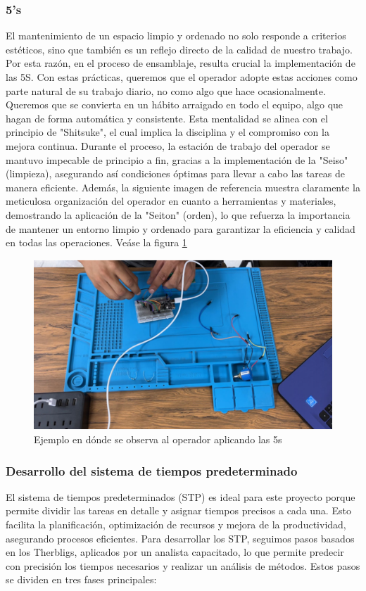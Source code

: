     \subsubsection{5's}
    El mantenimiento de un espacio limpio y ordenado no solo responde a criterios estéticos, sino que también es un reflejo directo de la calidad de nuestro trabajo. Por esta razón, en el proceso de ensamblaje, resulta crucial la implementación de las 5S. \cite{PgSantos}
    Con estas prácticas, queremos que el operador adopte estas acciones como parte natural de su trabajo diario, no como algo que hace ocasionalmente. Queremos que se convierta en un hábito arraigado en todo el equipo, algo que hagan de forma automática y consistente. Esta mentalidad se alinea con el principio de "Shitsuke", el cual implica la disciplina y el compromiso con la mejora continua. Durante el proceso, la estación de trabajo del operador se mantuvo impecable de principio a fin, gracias a la implementación de la "Seiso" (limpieza), asegurando así condiciones óptimas para llevar a cabo las tareas de manera eficiente. Además, la siguiente imagen de referencia    muestra claramente la meticulosa organización del operador en cuanto a herramientas y materiales,  demostrando la aplicación de la "Seiton" (orden), lo que refuerza la importancia de mantener un entorno limpio y ordenado para garantizar la eficiencia y calidad en todas las operaciones. \cite{manzano2016lean}Veáse la figura \ref{fig:5s}
    \begin{figure}[H]
         \centering
         \includegraphics[scale=0.4]{34/img/aplicandoLas5S.png}
         \caption{Ejemplo en dónde se observa al operador aplicando las 5s}
         \label{fig:5s}
     \end{figure}
    \subsubsection{Desarrollo del sistema de tiempos predeterminado}
    El sistema de tiempos predeterminados (STP) es ideal para este proyecto porque permite dividir las tareas en detalle y asignar tiempos precisos a cada una. Esto facilita la planificación, optimización de recursos y mejora de la productividad, asegurando procesos eficientes. Para desarrollar los STP, seguimos pasos basados en los Therbligs, aplicados por un analista capacitado, lo que permite predecir con precisión los tiempos necesarios y realizar un análisis de métodos. Estos pasos se dividen en tres fases principales:
    
